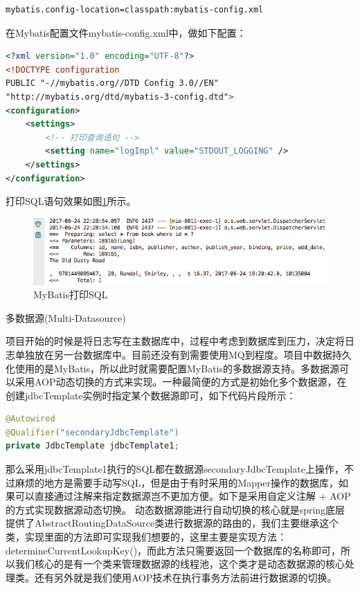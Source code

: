 \documentclass[12pt]{book}
\makeatletter
\numberwithin{dummy}{section}
\theoremstyle{ocrenumbox}
\theoremstyle{blacknumex}
\theoremstyle{blacknumbox}
\theoremstyle{ocrenum}
\renewcommand{\subsection}{\@startsection {subsection}{2}{\z@}
	{-3ex \@plus -0.1ex \@minus -.4ex}
	{0.5ex \@plus.2ex }
	{\normalfont\sffamily\bfseries}}
\makeatother
\begin{document}
\begin{lstlisting}[language=Bash]
mybatis.config-location=classpath:mybatis-config.xml
\end{lstlisting}

在Mybatis配置文件mybatis-config.xml中，做如下配置：

\begin{lstlisting}[language=XML]
<?xml version="1.0" encoding="UTF-8"?>
<!DOCTYPE configuration
PUBLIC "-//mybatis.org//DTD Config 3.0//EN"
"http://mybatis.org/dtd/mybatis-3-config.dtd">
<configuration>
	<settings>
		<!-- 打印查询语句 -->
		<setting name="logImpl" value="STDOUT_LOGGING" />
	</settings>
</configuration>
\end{lstlisting}

打印SQL语句效果如图\ref{fig:mybatisprintsql}所示。

\begin{figure}[htbp]
	\centering
	\includegraphics[scale=0.5]{mybatisprintsql.png}
	\caption{MyBatis打印SQL}
	\label{fig:mybatisprintsql}
\end{figure}

\subsection{多数据源(Multi-Datasource)}

项目开始的时候是将日志写在主数据库中，过程中考虑到数据库到压力，决定将日志单独放在另一台数据库中。目前还没有到需要使用MQ到程度。项目中数据持久化使用的是MyBatis，所以此时就需要配置MyBatis的多数据源支持。多数据源可以采用AOP动态切换的方式来实现。一种最简便的方式是初始化多个数据源，在创建jdbcTemplate实例时指定某个数据源即可，如下代码片段所示：

\begin{lstlisting}[language=Java]
@Autowired
@Qualifier("secondaryJdbcTemplate")
private JdbcTemplate jdbcTemplate1;
\end{lstlisting}

那么采用jdbcTemplate1执行的SQL都在数据源secondaryJdbcTemplate上操作，不过麻烦的地方是需要手动写SQL，但是由于有时采用的Mapper操作的数据库，如果可以直接通过注解来指定数据源岂不更加方便。如下是采用自定义注解 + AOP的方式实现数据源动态切换。
动态数据源能进行自动切换的核心就是spring底层提供了AbstractRoutingDataSource类进行数据源的路由的，我们主要继承这个类，实现里面的方法即可实现我们想要的，这里主要是实现方法：determineCurrentLookupKey()，而此方法只需要返回一个数据库的名称即可，所以我们核心的是有一个类来管理数据源的线程池，这个类才是动态数据源的核心处理类。还有另外就是我们使用AOP技术在执行事务方法前进行数据源的切换。
\end{document}
